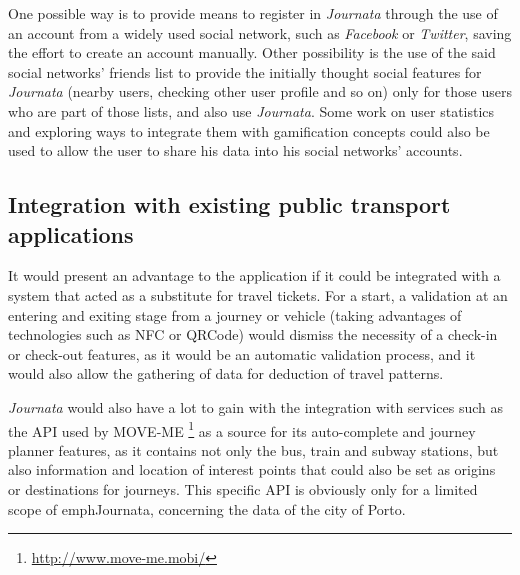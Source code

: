 One possible way is to provide means to register in \emph{Journata} through the use of an account from a widely used social network, such as \emph{Facebook} or \emph{Twitter}, saving the effort to create an account manually.
Other possibility is the use of the said social networks' friends list to provide the initially thought social features for \emph{Journata} (nearby users, checking other user profile and so on) only for those users who are part of those lists, and also use \emph{Journata}.
Some work on user statistics and exploring ways to integrate them with gamification concepts could also be used to allow the user to share his data into his social networks' accounts.


\subsection{Integration with existing public transport applications}

It would present an advantage to the application if it could be integrated with a system that acted as a substitute for travel tickets. For a start, a validation at an entering and exiting stage from a journey or vehicle (taking advantages of technologies such as NFC or QRCode) would dismiss the necessity of a check-in or check-out features, as it would be an automatic validation process, and it would also allow the gathering of data for deduction of travel patterns.

\emph{Journata} would also have a lot to gain with the integration with services such as the API used by MOVE-ME \footnote{\url{http://www.move-me.mobi/}} as a source for its auto-complete and journey planner features, as it contains not only the bus, train and subway stations, but also information and location of interest points that could also be set as origins or destinations for journeys. This specific API is obviously only for a limited scope of emph{Journata}, concerning the data of the city of Porto. 




